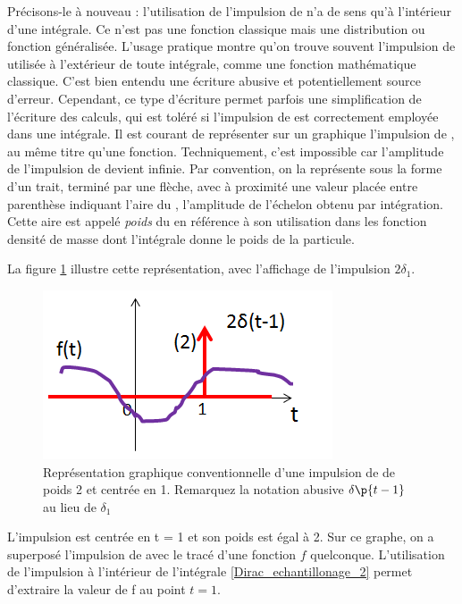 	Précisons-le à nouveau : l'utilisation de l'impulsion de
        \Dirac{} n'a de sens qu'à l'intérieur d'une intégrale. Ce n'est
        pas une fonction classique mais une distribution ou fonction
        généralisée. L'usage pratique montre qu'on trouve souvent
        l'impulsion de \Dirac{} utilisée à l'extérieur de toute
        intégrale, comme une fonction mathématique classique. C'est
        bien entendu une écriture abusive et potentiellement source
        d'erreur. Cependant, ce type d'écriture permet parfois une
        simplification de l'écriture des calculs, qui est toléré si
        l'impulsion de \Dirac{} est correctement employée dans une
        intégrale. Il est courant de représenter sur un graphique
        l'impulsion de \Dirac, au même titre qu'une
        fonction. Techniquement, c'est impossible car l'amplitude de
        l'impulsion de \Dirac{} devient infinie. Par convention, on la
        représente sous la forme d'un trait, terminé par une flèche,
        avec à proximité une valeur placée entre parenthèse indiquant
        l'aire du \Dirac, \cad{} l'amplitude de l'échelon obtenu par
        intégration. Cette aire est appelé \emph{poids} du \Dirac{} en
        référence à son utilisation dans les fonction densité de masse
        dont l'intégrale donne le poids de la particule.

        La figure \ref{fig:representation_dirac} illustre cette
        représentation, avec l'affichage de l'impulsion
        $2\delta_1$.
        \begin{figure}[htbp]
          \centering
          \includegraphics[scale=0.6]{images/representation_Dirac.png}
          \caption{Représentation graphique conventionnelle d'une
            impulsion de \Dirac de poids 2 et centrée en 1. Remarquez
            la notation abusive $\delta\p{t-1}$ au lieu de $\delta_1$}
          \label{fig:representation_dirac}
	\end{figure}
L'impulsion est centrée en t = 1 et son poids
        est égal à 2. Sur ce graphe, on a superposé l'impulsion de
        \Dirac{} avec le tracé d'une fonction $f$
        quelconque. L'utilisation de l'impulsion à l'intérieur de
        l'intégrale \ref{Dirac_echantillonage_2} permet d'extraire la
        valeur de f au point $t = 1$.


